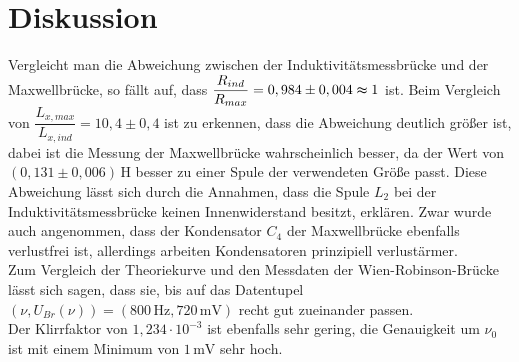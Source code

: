 \section{Diskussion}
\label{sec:Diskussion}
Vergleicht man die Abweichung zwischen der Induktivitätsmessbrücke und der Maxwellbrücke, so fällt auf, dass $\dfrac{R_{ind}}{R_{max}} = 0,984 \pm 0,004 \thickapprox 1 $ ist.
Beim Vergleich von  $\dfrac{L_{x,max}}{L_{x,ind}} = 10,4 \pm 0,4 $ ist zu erkennen, dass die Abweichung deutlich größer ist, dabei ist die Messung der Maxwellbrücke wahrscheinlich besser, da der Wert von $(0,131 \pm 0,006) \,\unit{\henry}$ besser zu einer Spule der verwendeten Größe passt.
Diese Abweichung lässt sich durch die Annahmen, dass die Spule $L_2$ bei der Induktivitätsmessbrücke keinen Innenwiderstand besitzt, erklären.
Zwar wurde auch angenommen, dass der Kondensator $C_4$ der Maxwellbrücke ebenfalls verlustfrei ist, allerdings arbeiten Kondensatoren prinzipiell verlustärmer. \\

Zum Vergleich der Theoriekurve und den Messdaten der Wien-Robinson-Brücke lässt sich sagen, dass sie, bis auf das Datentupel $(ν, U_{Br}(ν)) = (800 \,\unit{\hertz}, 720 \,\unit{\milli\volt})$ recht gut zueinander passen. \\

Der Klirrfaktor von $1,234 \cdot 10^{-3}$ ist ebenfalls sehr gering, die Genauigkeit um $ν_0$ ist mit einem Minimum von $1 \,\unit{\milli\volt}$ sehr hoch. 